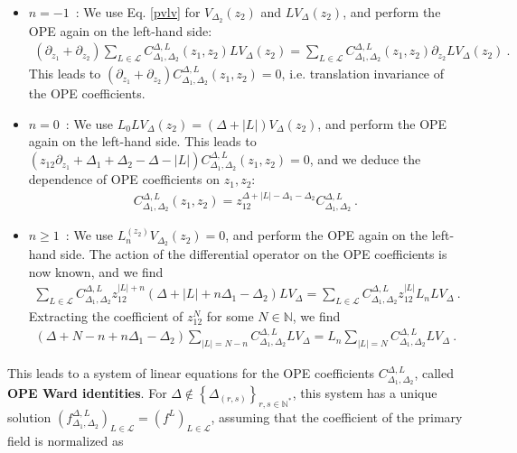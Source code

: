 \documentclass[12pt, a4paper]{article}
\newcommand{\myindex}[1]{\textbf{\boldmath #1}}
\theoremstyle{break}
\begin{document}
\begin{itemize}
 \item $\boxed{n=-1}$\ : We use Eq. \eqref{pvlv} for $V_{\Delta_2}(z_2)$ and $LV_{\Delta}(z_2)$, and perform the OPE again on the left-hand side:
 \begin{align}
 \left(\partial_{z_1}+\partial_{z_2}\right) \sum_{L\in \mathcal{L}} C_{\Delta_1,\Delta_2}^{\Delta, L}(z_1,z_2)LV_\Delta(z_2) = \sum_{L\in \mathcal{L}} C_{\Delta_1,\Delta_2}^{\Delta, L}(z_1,z_2)\partial_{z_2} LV_\Delta(z_2) \ .
 \end{align}
 This leads to $(\partial_{z_1}+\partial_{z_2})C^{\Delta,L}_{\Delta_1,\Delta_2}(z_1,z_2)=0$, i.e. translation invariance of the OPE coefficients.
 \item $\boxed{n=0}$\ : We use $L_0LV_{\Delta}(z_2)= (\Delta+|L|) V_{\Delta}(z_2)$, and perform the OPE again on the left-hand side. This leads to $(z_{12}\partial_{z_1}+\Delta_1+\Delta_2-\Delta-|L|)C^{\Delta,L}_{\Delta_1,\Delta_2}(z_1,z_2) = 0$, and we deduce the dependence of OPE coefficients on $z_1,z_2$:
 \begin{align}
  C^{\Delta,L}_{\Delta_1,\Delta_2}(z_1,z_2) = z_{12}^{\Delta+|L|-\Delta_1-\Delta_2} C^{\Delta,L}_{\Delta_1,\Delta_2}\ . 
 \end{align}
\item $\boxed{n\geq 1}$\ : We use $L_n^{(z_2)}V_{\Delta_2}(z_2)=0$, and perform the OPE again on the left-hand side. The action of the differential operator on the OPE coefficients is now known, and we find 
\begin{align}
 \sum_{L\in\mathcal{L}} C^{\Delta,L}_{\Delta_1,\Delta_2}z_{12}^{|L|+n}(\Delta+|L|+n\Delta_1-\Delta_2) LV_{\Delta}= \sum_{L\in\mathcal{L}} C^{\Delta,L}_{\Delta_1,\Delta_2}z_{12}^{|L|}L_n LV_{\Delta}\ .
\end{align}
Extracting the coefficient of $z_{12}^N$ for some $N\in\mathbb{N}$, we find 
\begin{align}
 (\Delta+N-n+n\Delta_1-\Delta_2)\sum_{|L|=N-n} C^{\Delta,L}_{\Delta_1,\Delta_2}LV_{\Delta} = L_n \sum_{|L|=N}C^{\Delta,L}_{\Delta_1,\Delta_2} LV_{\Delta}\ .
 \label{opew}
\end{align}
\end{itemize}
This leads to a system of linear equations for the OPE coefficients $C^{\Delta,L}_{\Delta_1,\Delta_2}$, called \myindex{OPE Ward identities}. For $\Delta\notin \left\{\Delta_{(r,s)}\right\}_{r,s\in\mathbb{N}^*}$, this system has a unique solution $\left(f^{\Delta,L}_{\Delta_1,\Delta_2}\right)_{L\in\mathcal{L}}=\left(f^L\right)_{L\in\mathcal{L}}$, assuming that the coefficient of the primary field is normalized as
\end{document}
